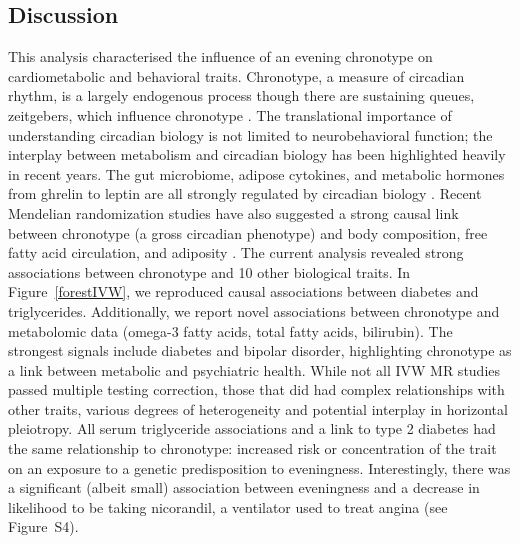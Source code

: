 \documentclass[genes,article,accept,moreauthors,pdftex]{Definitions/mdpi}
\begin{document}
\begin{paracol}{2}
\section{Discussion}

This analysis characterised the influence of an evening chronotype on cardiometabolic and behavioral traits. Chronotype, a measure of circadian rhythm, is a largely endogenous process though there are sustaining queues, zeitgebers, which influence chronotype \cite{albrecht_timing_2012}. The translational importance of understanding circadian biology is not limited to neurobehavioral function; the interplay between metabolism and circadian biology has been highlighted heavily in recent years. The gut microbiome, adipose cytokines, and metabolic hormones from ghrelin to leptin are all strongly regulated by circadian biology \cite{li_circadian_2020,socaciu_melatonin_2020,pan_circadian_2020}. Recent Mendelian randomization studies have also suggested a strong causal link between chronotype (a gross circadian phenotype) and body composition, free fatty acid circulation, and adiposity \cite{adams_evaluating_2019,jones_genome-wide_2019}. The current analysis revealed strong associations between chronotype and 10 other biological traits. In Figure~\ref{forestIVW}, we reproduced causal associations between diabetes and triglycerides. Additionally, we report novel associations  between chronotype and metabolomic data (omega-3 fatty acids, total fatty acids, bilirubin). The strongest signals include diabetes and bipolar disorder, highlighting chronotype as a link between metabolic and psychiatric health. While not all IVW MR studies passed multiple testing correction, those that did had complex relationships with other traits, various degrees of heterogeneity and potential interplay in horizontal pleiotropy.
All serum triglyceride associations and a link to type 2 diabetes had the same relationship to chronotype: increased risk or concentration of the trait on an exposure to a genetic predisposition to eveningness. Interestingly, there was a significant (albeit small) association between eveningness and a decrease in likelihood to be taking nicorandil, a ventilator used to treat angina (see {Figure~S4}). 

\end{paracol}
\end{document}
